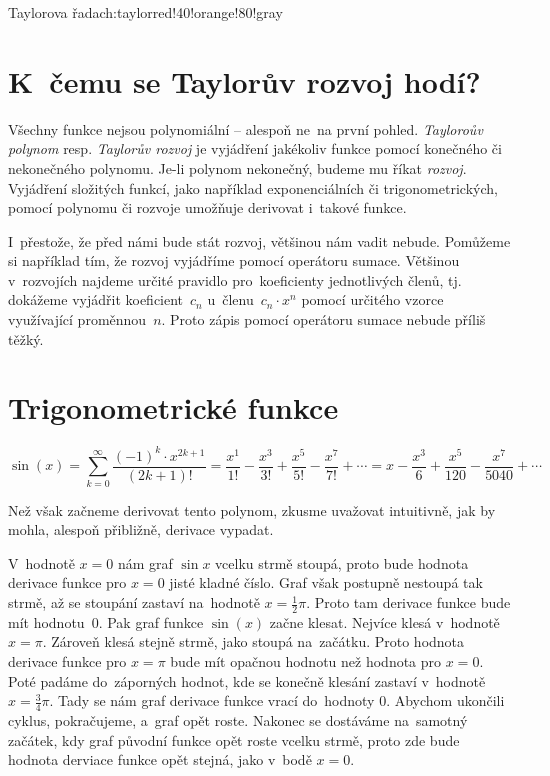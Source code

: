 \begin{chapterintro}{Taylorova řada}{ch:taylor}{red!40!orange!80!gray}{}
\end{chapterintro}

\section{K~čemu se Taylorův rozvoj hodí?}
\label{sec:taylor-uvod}

Všechny funkce nejsou polynomiální -- alespoň ne~na první pohled. \emph{Tayloroův
polynom} resp. \emph{Taylorův rozvoj} je vyjádření jakékoliv funkce pomocí konečného
či nekonečného polynomu. Je-li polynom nekonečný, budeme mu říkat \emph{rozvoj}.
Vyjádření složitých funkcí, jako například exponenciálních či trigonometrických,
pomocí polynomu či rozvoje umožňuje derivovat i~takové funkce.

I~přestože, že před námi bude stát rozvoj, většinou nám vadit nebude. Pomůžeme si
například tím, že rozvoj vyjádříme pomocí operátoru sumace. Většinou v~rozvojích
najdeme určité pravidlo pro~koeficienty jednotlivých členů, tj. dokážeme vyjádřit
koeficient~$c_n$ u~členu~${c_n \cdot x^n}$ pomocí určitého vzorce využívající
proměnnou~$n$. Proto zápis pomocí operátoru sumace nebude příliš těžký.

\section{Trigonometrické funkce}
\label{sec:taylor-trigonometrie}

\begin{equation*}
    \sin(x)
    = \sum_{k=0}^{\infty} \frac{(-1)^k \cdot x^{2k + 1}}{(2k + 1)!}
    = \frac{x^1}{1!} - \frac{x^3}{3!} + \frac{x^5}{5!} - \frac{x^7}{7!} + \cdots
    = x - \frac{x^3}{6} + \frac{x^5}{120} - \frac{x^7}{5040} + \cdots
\end{equation*}

Než však začneme derivovat tento polynom, zkusme uvažovat intuitivně, jak by mohla, alespoň přibližně, derivace vypadat.

V~hodnotě $x = 0$ nám graf $\sin x$ vcelku strmě stoupá, proto bude hodnota derivace funkce pro $x = 0$ jisté kladné číslo. Graf však postupně nestoupá tak strmě, až se stoupání zastaví na~hodnotě $x = \frac12 \pi$. Proto tam derivace funkce bude mít hodnotu~0. Pak graf funkce $\sin(x)$ začne klesat. Nejvíce klesá v~hodnotě $x = \pi$. Zároveň klesá stejně strmě, jako stoupá na~začátku. Proto hodnota derivace funkce pro $x = \pi$ bude mít opačnou hodnotu než hodnota pro $x = 0$. Poté padáme do~záporných hodnot, kde se konečně klesání zastaví v~hodnotě $x = \frac34 \pi$. Tady se nám graf derivace funkce vrací do~hodnoty 0. Abychom ukončili cyklus, pokračujeme, a~graf opět roste. Nakonec se dostáváme na~samotný začátek, kdy graf původní funkce opět roste vcelku strmě, proto zde bude hodnota derviace funkce opět stejná, jako v~bodě $x = 0$.

